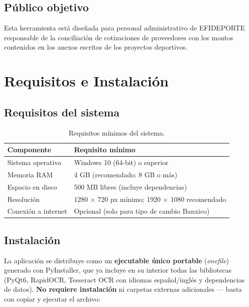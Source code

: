 \documentclass[12pt, a4paper, oneside]{report}
\begin{document}
\section{Público objetivo}

Esta herramienta está diseñada para personal administrativo de EFIDEPORTE
responsable de la conciliación de cotizaciones de proveedores con los montos
contenidos en los anexos escritos de los proyectos deportivos.

\chapter{Requisitos e Instalación}

\section{Requisitos del sistema}

\begin{table}[H]
  \centering
  \begin{tabularx}{\linewidth}{lX}
    \toprule
    \textbf{Componente} & \textbf{Requisito mínimo} \\
    \midrule
    Sistema operativo & Windows 10 (64-bit) o superior \\
    Memoria RAM       & 4 GB (recomendado: 8 GB o más) \\
    Espacio en disco  & 500 MB libres (incluye dependencias) \\
    Resolución        & 1280 × 720 px mínimo; 1920 × 1080 recomendado \\
    Conexión a internet & Opcional (solo para tipo de cambio Banxico) \\
    \bottomrule
  \end{tabularx}
  \caption{Requisitos mínimos del sistema.}
\end{table}

\section{Instalación}

La aplicación se distribuye como un \textbf{ejecutable único portable}
(\textit{onefile}) generado con PyInstaller, que ya incluye en su interior todas las
bibliotecas (PyQt6, RapidOCR, Tesseract OCR con idiomas español/inglés y dependencias de
datos). \textbf{No requiere instalación} ni carpetas externas adicionales — basta con
copiar y ejecutar el archivo:
\end{document}
